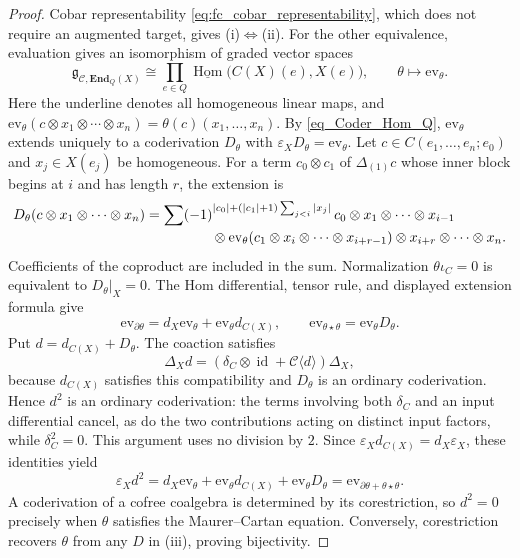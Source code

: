 \documentclass[11pt,letterpaper]{article}
\numberwithin{equation}{section}
\theoremstyle{plain}
\theoremstyle{definition}
\theoremstyle{remark}
\newcommand{\Hom}{\operatorname{Hom}}
\newcommand{\id}{\operatorname{id}}
\newcommand{\ev}{\mathrm{ev}}
\begin{document}
\begin{proof}
Cobar representability \eqref{eq:fc_cobar_representability}, which does not require an augmented target, gives (i)$\Leftrightarrow$(ii). For the other equivalence, evaluation gives an isomorphism of graded vector spaces
\begin{equation*}\mathfrak g_{\mathscr C,\mathbf{End}_Q(X)}
 \cong\prod_{e\in Q}\underline{\Hom}\bigl(C(X)(e),X(e)\bigr),
 \qquad\theta\longmapsto\ev_\theta.
\end{equation*}
Here the underline denotes all homogeneous linear maps, and
$\ev_\theta(c\otimes x_1\otimes\cdots\otimes x_n)=\theta(c)(x_1,\ldots,x_n)$.
By \eqref{eq_Coder_Hom_Q}, $\ev_\theta$ extends uniquely to a coderivation $D_\theta$ with $\varepsilon_XD_\theta=\ev_\theta$.
Let $c\in C(e_1,\ldots,e_n;e_0)$ and $x_j\in X(e_j)$ be homogeneous. For a term $c_0\otimes c_1$ of $\Delta_{(1)}c$ whose inner block begins at $i$ and has length $r$, the extension is
\[
\begin{aligned}
 &D_\theta(c\otimes x_1\otimes\cdots\otimes x_n) =\sum(-1)^{|c_0|+(|c_1|+1)\sum_{j<i}|x_j|}\,
 c_0\otimes x_1\otimes\cdots\otimes x_{i-1}\\[-2pt]
 &\hspace{50mm}\otimes\ev_\theta(c_1\otimes x_i\otimes\cdots\otimes x_{i+r-1})
 \otimes x_{i+r}\otimes\cdots\otimes x_n.
\end{aligned}
\]
Coefficients of the coproduct are included in the sum. Normalization $\theta\iota_C=0$ is equivalent to $D_\theta|_X=0$.
The Hom differential, tensor rule, and displayed extension formula give
\[ \ev_{\partial\theta}=d_X\ev_\theta+\ev_\theta d_{C(X)}, \qquad \ev_{\theta\star\theta}=\ev_\theta D_\theta.
\]
Put $d=d_{C(X)}+D_\theta$. The coaction satisfies
\[
 \Delta_Xd=(\delta_C\otimes\id+\mathscr C\langle d\rangle)\Delta_X,
\]
because $d_{C(X)}$ satisfies this compatibility and $D_\theta$ is an ordinary coderivation. Hence $d^2$ is an ordinary coderivation: the terms involving both $\delta_C$ and an input differential cancel, as do the two contributions acting on distinct input factors, while $\delta_C^2=0$. This argument uses no division by $2$. Since $\varepsilon_Xd_{C(X)}=d_X\varepsilon_X$, these identities yield
\[
\varepsilon_Xd^2
=d_X\ev_\theta+\ev_\theta d_{C(X)}+\ev_\theta D_\theta
=\ev_{\partial\theta+\theta\star\theta}.
\]
A coderivation of a cofree coalgebra is determined by its corestriction, so $d^2=0$ precisely when $\theta$ satisfies the Maurer--Cartan equation. Conversely, corestriction recovers $\theta$ from any $D$ in (iii), proving bijectivity.
\end{proof}
\end{document}
